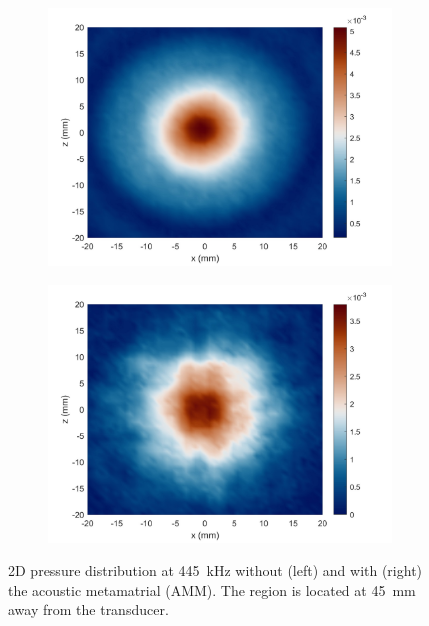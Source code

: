 \documentclass{article}
\begin{document}
\begin{figure}[!htb]
    \centering
    \begin{subfigure}{0.45\textwidth}
        \centering
        \includegraphics[width = \textwidth]{../../matlab/exp/fig/CalPowTransCoef_230302C_PrsVoid.jpg}
    \end{subfigure}
    \begin{subfigure}{0.45\textwidth}
        \centering
        \includegraphics[width = \textwidth]{../../matlab/exp/fig/CalPowTransCoef_230302C_PrsAMM.jpg}
    \end{subfigure}
    \caption{2D pressure distribution at 445~kHz without (left) and with (right) the acoustic metamatrial (AMM).
    The region is located at 45~mm away from the transducer.}
    \label{fig:f9j:0213921j09j}
\end{figure}
\end{document}

